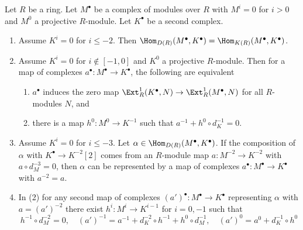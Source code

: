 \begin{lemma}
\label{lemma-map-out-of-almost-free}
Let $R$ be a ring. Let $M^\bullet$ be a complex of modules over $R$
with $M^i = 0$ for $i > 0$ and $M^0$ a projective $R$-module.
Let $K^\bullet$ be a second complex.
\begin{enumerate}
\item Assume $K^i = 0$ for $i \leq -2$. Then
$\Hom_{D(R)}(M^\bullet, K^\bullet) = \Hom_{K(R)}(M^\bullet, K^\bullet)$.
\item Assume $K^i = 0$ for $i \not \in [-1, 0]$ and
$K^0$ a projective $R$-module. Then for a map of complexes
$a^\bullet : M^\bullet \to K^\bullet$, the following are equivalent
\begin{enumerate}
\item $a^\bullet$ induces the zero map $\Ext^1_R(K^\bullet, N) \to
\Ext^1_R(M^\bullet, N)$ for all $R$-modules $N$, and
\item there is a map $h^0 : M^0 \to K^{-1}$ such that
$a^{-1} + h^0 \circ d^{-1}_K = 0$.
\end{enumerate}
\item Assume $K^i = 0$ for $i \leq -3$. Let
$\alpha \in \Hom_{D(R)}(M^\bullet, K^\bullet)$. If the
composition of $\alpha$ with
$K^\bullet \to K^{-2}[2]$ comes from an $R$-module map
$a : M^{-2} \to K^{-2}$ with $a \circ d_M^{-3} = 0$, then
$\alpha$ can be represented by a map of complexes
$a^\bullet : M^\bullet \to K^\bullet$ with $a^{-2} = a$.
\item In (2) for any second map of complexes
$(a')^\bullet : M^\bullet \to K^\bullet$
representing $\alpha$ with $a = (a')^{-2}$
there exist $h^i : M^i \to K^{i - 1}$ for $i = 0, -1$ such that
$$
h^{-1} \circ d_M^{-2} = 0, \quad
(a')^{-1} = a^{-1} + d_K^{-2} \circ h^{-1} + h^0 \circ d_M^{-1},\quad
(a')^0 = a^0 + d_K^{-1} \circ h^0
$$
\end{enumerate}
\end{lemma}

